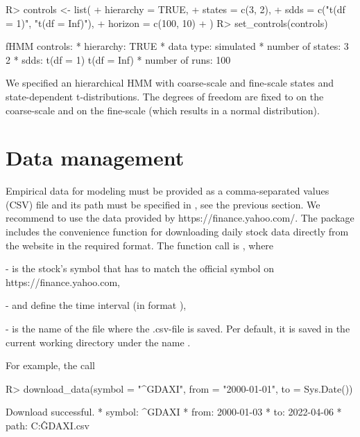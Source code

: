 \documentclass[article]{jss}
\newcommand{\fct}[1]{\code{#1()}}
\begin{document}
%
\begin{Schunk}
\begin{Sinput}
R> controls <- list(
+    hierarchy = TRUE,
+    states    = c(3, 2),
+    sdds      = c("t(df = 1)", "t(df = Inf)"),
+    horizon   = c(100, 10)
+  )
R> set_controls(controls)
\end{Sinput}
\begin{Soutput}
fHMM controls:
* hierarchy: TRUE 
* data type: simulated 
* number of states: 3 2 
* sdds: t(df = 1) t(df = Inf) 
* number of runs: 100  
\end{Soutput}
\end{Schunk}
%

We specified an hierarchical HMM with  coarse-scale and  fine-scale states  and state-dependent t-distributions. The degrees of freedom are fixed to  on the coarse-scale and  on the fine-scale (which results in a normal distribution).


\section{Data management} \label{sec:data_management} %

Empirical data for modeling must be provided as a comma-separated values (CSV) file and its path must be specified in \fct{set\_controls}, see the previous section. We recommend to use the data provided by https://finance.yahoo.com/. The  package includes the convenience function \fct{download\_data} for downloading daily stock data directly from the website in the required format. The function call is , where

-  is the stock's symbol that has to match the official symbol on https://finance.yahoo.com,

-  and  define the time interval (in format ),

-  is the name of the file where the .csv-file is saved. Per default, it is saved in the current working directory under the name .

For example, the call

%
\begin{Schunk}
\begin{Sinput}
R> download_data(symbol = "^GDAXI", from = "2000-01-01", to = Sys.Date())
\end{Sinput}
\begin{Soutput}
Download successful.
* symbol: ^GDAXI 
* from: 2000-01-03 
* to: 2022-04-06 
* path: C:\Users\timo\Desktop\OpenPopulationSCRWithRandomEffects\fHMM\jss\^GDAXI.csv
\end{Soutput}
\end{Schunk}
%
\end{document}
